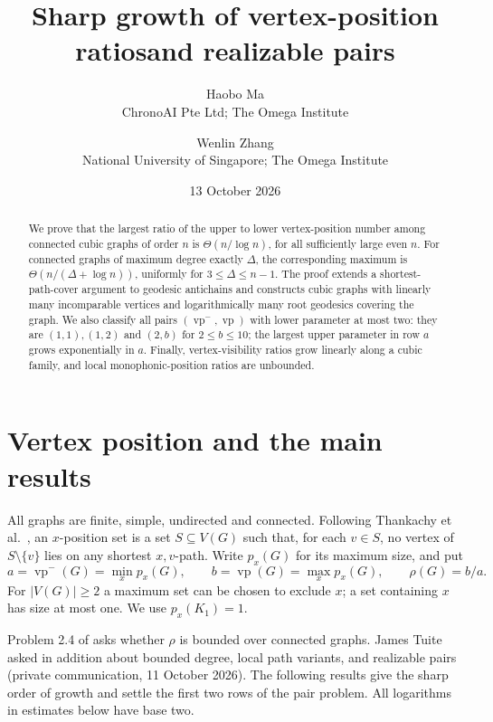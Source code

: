 \documentclass[11pt]{article}
\title{Sharp growth of vertex-position ratios\newline and realizable pairs}
\author{Haobo Ma\\\small ChronoAI Pte Ltd; The Omega Institute
\and Wenlin Zhang\\\small National University of Singapore; The Omega Institute}
\date{13 October 2026}
\theoremstyle{remark}\newtheorem{remark}[theorem]{Remark}
\newcommand{\vp}{\operatorname{vp}}
\newcommand{\vpm}{\operatorname{vp}^{-}}
\begin{document}
\maketitle
\begin{abstract}
We prove that the largest ratio of the upper to lower vertex-position number
among connected cubic graphs of order $n$ is $\Theta(n/\log n)$, for all
sufficiently large even $n$. For connected graphs of maximum degree exactly
$\Delta$, the corresponding maximum is $\Theta(n/(\Delta+\log n))$, uniformly
for $3\le\Delta\le n-1$. The proof extends a shortest-path-cover argument to
geodesic antichains and constructs cubic graphs with linearly many incomparable
vertices and logarithmically many root geodesics covering the graph. We also
classify all pairs $(\vpm,\vp)$ with lower parameter at most two: they are
$(1,1),(1,2)$ and $(2,b)$ for $2\le b\le10$; the largest upper parameter in
row $a$ grows exponentially in $a$. Finally, vertex-visibility ratios grow
linearly along a cubic family, and local monophonic-position ratios are
unbounded.
\end{abstract}

\section{Vertex position and the main results}
All graphs are finite, simple, undirected and connected. Following
Thankachy et al.\ \cite{position}, an $x$-position set is a set $S\subseteq V(G)$
such that, for each $v\in S$, no vertex of $S\setminus\{v\}$ lies on any
shortest $x,v$-path. Write $p_x(G)$ for its maximum size, and put
\[
 a=\vpm(G)=\min_xp_x(G),\qquad b=\vp(G)=\max_xp_x(G),\qquad \rho(G)=b/a.
\]
For $|V(G)|\ge2$ a maximum set can be chosen to exclude $x$; a set containing
$x$ has size at most one. We use $p_x(K_1)=1$.

Problem 2.4 of \cite{position} asks whether $\rho$ is bounded over connected
graphs. James Tuite asked in addition about bounded degree, local path
variants, and realizable pairs (private communication, 11 October 2026).
The following results give the sharp order of growth and settle the first
two rows of the pair problem. All logarithms in estimates below have base two.
\end{document}
